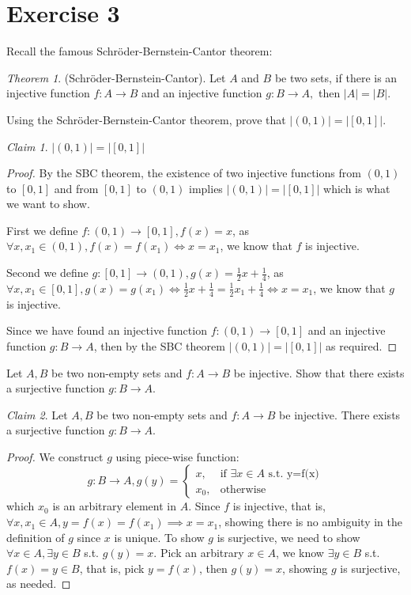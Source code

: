 \documentclass{homework}
\newcommand{\ra}{\rightarrow}
\newcommand{\?}{\stackrel{?}{=}}
\newcommand{\func}[3]{#1: #2 \rightarrow #3}
\theoremstyle{remark}
\newtheorem*{claim}{Claim}
\newtheorem*{theorem}{Theorem}
\begin{document}
\section*{Exercise 3}
Recall the famous Schröder-Bernstein-Cantor theorem:
\begin{theorem}
    (Schröder-Bernstein-Cantor). Let $A$ and $B$ be two sets, if there is an injective function $f: A\rightarrow B$ and an injective function $\func{g}{B}{A},$ then $|A|=|B|$.
\end{theorem}
\question[1] Using the Schröder-Bernstein-Cantor theorem, prove that $|(0,1)|=|[0,1]|$.
\begin{claim}
    $|(0,1)|=|[0,1]|$
\end{claim}
\begin{proof}
    By the SBC theorem, the existence of two injective functions from $(0,1)$ to $[0,1]$ and from $[0,1]$ to $(0,1)$  implies $|(0,1)|=|[0,1]|$ which is what we want to show. 

    First we define $f:(0,1)\ra[0,1], f(x)=x$, as $\forall x,x_1\in(0,1), f(x)=f(x_1)\iff x=x_1$, we know that $f$ is injective. 

    Second we define $g:[0,1]\ra(0,1),g(x)=\frac12x+\frac14$, as $\forall x,x_1\in[0,1], g(x)=g(x_1)\iff \frac12x+\frac14=\frac12x_1+\frac14\iff x=x_1$, we know that $g$ is injective. 

    Since we have found an injective function $f:(0,1)\ra[0,1]$ and an injective function $\func{g}{B}{A}$, then by the SBC theorem $|(0,1)|=|[0,1]|$ as required. 
\end{proof}

\question[2] Let $A,B$ be two non-empty sets and $\func{f}{A}{B}$ be injective. Show that there exists a surjective function $\func{g}{B}{A}$.
\begin{claim}
    Let $A,B$ be two non-empty sets and $\func{f}{A}{B}$ be injective. There exists a surjective function $\func{g}{B}{A}$.
\end{claim}
\begin{proof}
    We construct $g$ using piece-wise function: $$g: B\ra A, g(y)=\left\{\begin{array}{cc}
        x, & \text{if $\exists x\in A$ s.t. y=f(x)} \\
        x_0, & \text{otherwise} 
    \end{array}\right.$$ which $x_0$ is an arbitrary element in $A$. Since $f$ is injective, that is, $\forall x,x_1\in A, y=f(x)=f(x_1)\implies x=x_1$, showing there is no ambiguity in the definition of $g$ since $x$ is unique. To show $g$ is surjective, we need to show $\forall x\in A,\exists y\in B$ s.t. $g(y)=x$. Pick an arbitrary $x\in A$, we know $\exists y\in B$ s.t. $f(x)=y\in B$, that is, pick $y=f(x)$, then $g(y)=x$, showing $g$ is surjective, as needed. 
\end{proof}
\end{document}
